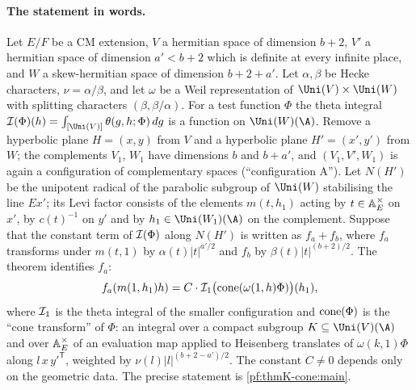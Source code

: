 \paragraph{The statement in words.}
Let $E/F$ be a CM extension, $V$ a hermitian space of dimension $b+2$, $V'$ a hermitian space of dimension
$a'<b+2$ which is definite at every infinite place, and $W$ a skew-hermitian space of dimension $b+2+a'$.  Let
$\alpha,\beta$ be Hecke characters, $\nu=\alpha/\beta$, and let $\omega$ be a Weil representation of
$\Uni(V)\times\Uni(W)$ with splitting characters $(\beta,\beta/\alpha)$.  For a test function $\Phi$ the theta
integral $\thmKconeI(\Phi)(h)=\int_{[\Uni(V)]}\theta(g,h;\Phi)\,dg$ is a function on $\Uni(W)(\A)$.  Remove a
hyperbolic plane $H=(x,y)$ from $V$ and a hyperbolic plane $H'=(x',y')$ from $W$; the complements $V_1$, $W_1$ have
dimensions $b$ and $b+a'$, and $(V_1,V',W_1)$ is again a configuration of complementary spaces (``configuration
A'').  Let $N(H')$ be the unipotent radical of the parabolic subgroup of $\Uni(W)$ stabilising the line $Ex'$; its
Levi factor consists of the elements $m(t,h_1)$ acting by $t\in\mathbb{A}_E^\times$ on $x'$, by $c(t)^{-1}$ on $y'$
and by $h_1\in\Uni(W_1)(\A)$ on the complement.  Suppose that the constant term of $\mathcal{I}(\Phi)$ along $N(H')$
is written as $f_a+f_b$, where $f_a$ transforms under $m(t,1)$ by $\alpha(t)|t|^{a'/2}$ and $f_b$ by
$\beta(t)|t|^{(b+2)/2}$.  The theorem identifies $f_a$:
\[
  f_a(m(1,h_1)h)=C\cdot\mathcal{I}_1\bigl(\operatorname{cone}(\omega(1,h)\Phi)\bigr)(h_1),
\]
where $\mathcal{I}_1$ is the theta integral of the smaller configuration and $\operatorname{cone}(\Phi)$ is the ``cone
transform'' of $\Phi$: an integral over a compact subgroup $K\subseteq\Uni(V)(\A)$ and over $\mathbb{A}_E^\times$ of
an evaluation map applied to Heisenberg translates of $\omega(k,1)\Phi$ along $l\,x\,y'^{\mathsf T}$, weighted by
$\nu(l)|l|^{(b+2-a')/2}$.  The constant $C\neq0$ depends only on the geometric data.  The precise statement is
\cref{pf:thmK-cone:main}.

